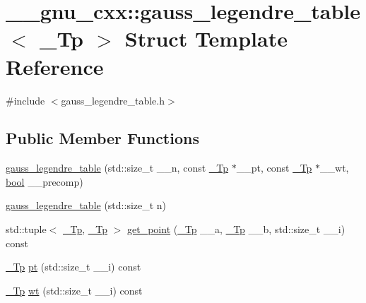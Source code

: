 \hypertarget{struct____gnu__cxx_1_1gauss__legendre__table}{}\section{\+\_\+\+\_\+gnu\+\_\+cxx\+:\+:gauss\+\_\+legendre\+\_\+table$<$ \+\_\+\+Tp $>$ Struct Template Reference}
\label{struct____gnu__cxx_1_1gauss__legendre__table}


{\ttfamily \#include $<$gauss\+\_\+legendre\+\_\+table.\+h$>$}

\subsection*{Public Member Functions}
\begin{DoxyCompactItemize}
\item 
\hyperlink{struct____gnu__cxx_1_1gauss__legendre__table_a8984aa2f4c44ecdcee67ee91043f002b}{gauss\+\_\+legendre\+\_\+table} (std\+::size\+\_\+t \+\_\+\+\_\+n, const \hyperlink{namespace____gnu__cxx_a3b19a9c800ca194374ef9172290f7d79}{\+\_\+\+Tp} $\ast$\+\_\+\+\_\+pt, const \hyperlink{namespace____gnu__cxx_a3b19a9c800ca194374ef9172290f7d79}{\+\_\+\+Tp} $\ast$\+\_\+\+\_\+wt, \hyperlink{namespace____gnu__cxx_ae83aca57f97767d5d09188718728a0ac}{bool} \+\_\+\+\_\+precomp)
\item 
\hyperlink{struct____gnu__cxx_1_1gauss__legendre__table_a135f6261d6822974a4fe104dadffdac3}{gauss\+\_\+legendre\+\_\+table} (std\+::size\+\_\+t n)
\item 
std\+::tuple$<$ \hyperlink{namespace____gnu__cxx_a3b19a9c800ca194374ef9172290f7d79}{\+\_\+\+Tp}, \hyperlink{namespace____gnu__cxx_a3b19a9c800ca194374ef9172290f7d79}{\+\_\+\+Tp} $>$ \hyperlink{struct____gnu__cxx_1_1gauss__legendre__table_a7124fe061efc34ee549245a711b0aab2}{get\+\_\+point} (\hyperlink{namespace____gnu__cxx_a3b19a9c800ca194374ef9172290f7d79}{\+\_\+\+Tp} \+\_\+\+\_\+a, \hyperlink{namespace____gnu__cxx_a3b19a9c800ca194374ef9172290f7d79}{\+\_\+\+Tp} \+\_\+\+\_\+b, std\+::size\+\_\+t \+\_\+\+\_\+i) const
\item 
\hyperlink{namespace____gnu__cxx_a3b19a9c800ca194374ef9172290f7d79}{\+\_\+\+Tp} \hyperlink{struct____gnu__cxx_1_1gauss__legendre__table_a22c34439f95a9cd22e95e37442127f63}{pt} (std\+::size\+\_\+t \+\_\+\+\_\+i) const
\item 
\hyperlink{namespace____gnu__cxx_a3b19a9c800ca194374ef9172290f7d79}{\+\_\+\+Tp} \hyperlink{struct____gnu__cxx_1_1gauss__legendre__table_affd960260dce4c36ad22f9c34b411bc7}{wt} (std\+::size\+\_\+t \+\_\+\+\_\+i) const
\end{DoxyCompactItemize}
